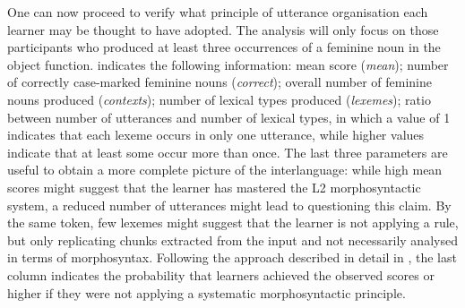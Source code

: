 One can now proceed to verify what principle of utterance organisation each learner may be thought to have adopted. The analysis will only focus on those participants who produced at least three occurrences of a feminine noun in the object function.  indicates the following information:
mean score (\textit{mean});
number of correctly case-marked feminine nouns (\textit{correct});
overall number of feminine nouns produced (\textit{contexts});
number of lexical types produced (\textit{lexemes});
ratio between number of utterances and number of lexical types, in which a value of 1 indicates that each lexeme occurs in only one utterance, while higher values indicate that at least some occur more than once. The last three parameters are useful to obtain a more complete picture of the interlanguage: while high mean scores might suggest that the learner has mastered the L2 morphosyntactic system, a reduced number of utterances might lead to questioning this claim. By the same token, few lexemes might suggest that the learner is not applying a rule, but only replicating chunks extracted from the input and not necessarily analysed in terms of morphosyntax. Following the approach described in detail in , the last column indicates the probability that learners achieved the observed scores or higher if they were not applying a systematic morphosyntactic principle.

\begin{table}
    \caption{Semi-spontaneous production task, morphosyntactic principle probability by learner}
    \label{tab:07:5}
\end{table}

